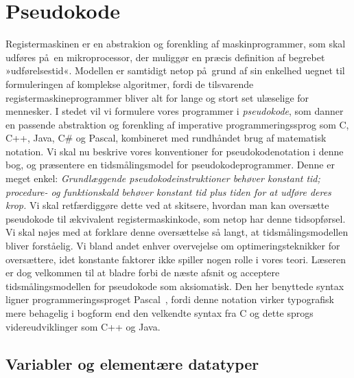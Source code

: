 \section{Pseudokode}


Registermaskinen er en abstrakion og forenkling af maskinprogrammer, som skal udføres på en mikroprocessor, der muliggør en præcis definition af begrebet »udførelsestid«.
Modellen er samtidigt netop på grund af sin enkelhed uegnet til formuleringen af komplekse algoritmer, fordi de tilsvarende registermaskineprogrammer bliver alt for lange og stort set ulæselige for mennesker.
I stedet vil vi formulere vores programmer i \emph{pseudokode}, som danner en passende abstraktion og forenkling af imperative programmeringssprog som C, C++, Java, C\# og Pascal,
kombineret med rundhåndet brug af matematisk notation.
Vi skal nu beskrive vores konventioner for pseudokodenotation i denne bog, og præsentere en tidsmålingsmodel for pseudokodeprogrammer.
Denne er meget enkel: 
\emph{Grundlæggende pseudokodeinstruktioner behøver konstant tid; procedure- og funktionskald behøver konstant tid plus tiden for at udføre deres krop.}
Vi skal retfærdiggøre dette ved at skitsere, hvordan man kan oversætte pseudokode til ækvivalent registermaskinkode, som netop har denne tidsopførsel.
Vi skal nøjes med at forklare denne oversættelse så langt, at tidsmålingsmodellen bliver forståelig.
Vi bland andet enhver overvejelse om optimeringsteknikker for oversættere,
idet konstante faktorer ikke spiller nogen rolle i vores teori.
Læseren er dog velkommen til at bladre forbi de næste afsnit og acceptere tidsmålingsmodellen for pseudokode som aksiomatisk.
Den her benyttede syntax ligner programmeringssproget Pascal~\cite{JenWir91}, fordi denne notation virker typografisk mere behagelig i bogform end den velkendte syntax fra C og dette sprogs videreudviklinger som C++ og Java.

\subsection{Variabler og elementære datatyper}

